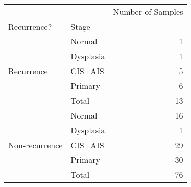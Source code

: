 \begin{tabular}{l|lr}
\toprule
               &       & Number of Samples \\
Recurrence? & Stage &                   \\
\midrule
\multirow{5}{*}{Recurrence} & Normal &                 1 \\
               & Dysplasia &                 1 \\
               & CIS+AIS &                 5 \\
               & Primary &                 6 \\
               & Total &                13 \\
\cline{1-3}
\multirow{5}{*}{Non-recurrence} & Normal &                16 \\
               & Dysplasia &                 1 \\
               & CIS+AIS &                29 \\
               & Primary &                30 \\
               & Total &                76 \\
\bottomrule
\end{tabular}
